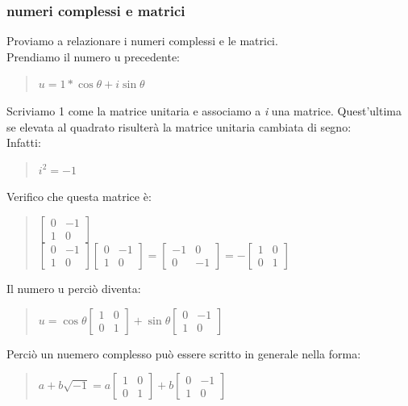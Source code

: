 \documentclass[a4paper]{article}
\begin{document}
\subsubsection{numeri complessi e matrici}
Proviamo a relazionare i numeri complessi e le matrici.
\\Prendiamo il numero u precedente:
\begin{quote} \centering$u=1*\cos\theta+\textit{i}\sin\theta
$\end{quote}
Scriviamo 1 come la matrice unitaria e associamo a \textit{i} una matrice. Quest'ultima se elevata al quadrato risulterà la matrice unitaria cambiata di segno:
\\Infatti:
\begin{quote} \centering $\textit{i}^2=-1
$\end{quote}
Verifico che questa matrice è:
\begin{quote} \centering $\left[\begin{matrix}0&-1\\ 1&0 \end{matrix}\right]
$
\bigskip \\
$\left[\begin{matrix}0&-1\\ 1&0 \end{matrix}\right]
\left[\begin{matrix}0&-1\\ 1&0 \end{matrix}\right]
= \left[\begin{matrix}-1&0 \\ 0&-1 \end{matrix}\right]
=-\left[\begin{matrix}1&0 \\ 0&1 \end{matrix}\right]
$\end{quote}
Il numero u perciò diventa:
\begin{quote} \centering$u=\cos\theta\left[\begin{matrix}1&0 \\ 0&1 \end{matrix}\right]+\sin\theta\left[\begin{matrix}0&-1\\ 1&0 \end{matrix}\right]
$\end{quote}
Perciò un nuemero complesso può essere scritto in generale nella forma:
\begin{quote} \centering $a+b\sqrt{-1}=a \left[\begin{matrix}1&0 \\ 0&1 \end{matrix}\right]+ b\left[\begin{matrix}0&-1\\ 1&0 \end{matrix}\right]
$\end{quote}
\end{document}
